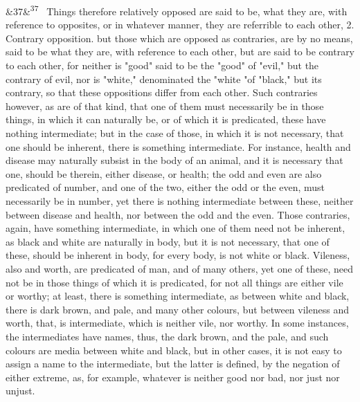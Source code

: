 \documentclass[12pt]{article}
\newcommand{\para}[1][]{\par\noindent\ifx&#1&\else\textsuperscript{\footnotesize #1}~\fi}
\begin{document}
\para[37] Things therefore relatively opposed are said to be, what they are, with reference to opposites, or in whatever manner, they are referrible to each other, 2. Contrary opposition. but those which are opposed as contraries, are by no means, said to be what they are, with reference to each other, but are said to be contrary to each other, for neither is "good" said to be the "good" of "evil," but the contrary of evil, nor is "white," denominated the "white "of "black," but its contrary, so that these oppositions differ from each other. Such contraries however, as are of that kind, that one of them must necessarily be in those things, in which it can naturally be, or of which it is predicated, these have nothing intermediate; but in the case of those, in which it is not necessary, that one should be inherent, there is something intermediate. For instance, health and disease may naturally subsist in the body of an animal, and it is necessary that one, should be therein, either disease, or health; the odd and even are also predicated of number, and one of the two, either the odd or the even, must necessarily be in number, yet there is nothing intermediate between these, neither between disease and health, nor between the odd and the even. Those contraries, again, have something intermediate, in which one of them need not be inherent, as black and white are naturally in body, but it is not necessary, that one of these, should be inherent in body, for every body, is not white or black. Vileness, also and worth, are predicated of man, and of many others, yet one of these, need not be in those things of which it is predicated, for not all things are either vile or worthy; at least, there is something intermediate, as between white and black, there is dark brown, and pale, and many other colours, but between vileness and worth, that, is intermediate, which is neither vile, nor worthy. In some instances, the intermediates have names, thus, the dark brown, and the pale, and such colours are media between white and black, but in other cases, it is not easy to assign a name to the intermediate, but the latter is defined, by the negation of either extreme, as, for example, whatever is neither good nor bad, nor just nor unjust.
\end{document}
